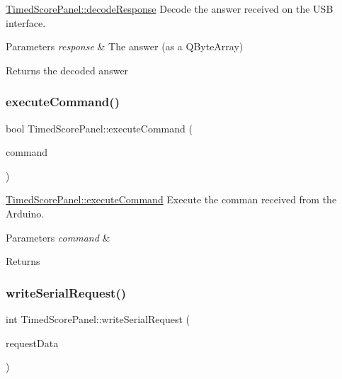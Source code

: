 \mbox{\hyperlink{classTimedScorePanel_aa4af54da0ec58b24e4e36812c90de9b8}{Timed\+Score\+Panel\+::decode\+Response}} Decode the answer received on the U\+SB interface. 


\begin{DoxyParams}{Parameters}
{\em response} & The answer (as a Q\+Byte\+Array) \\
\hline
\end{DoxyParams}
\begin{DoxyReturn}{Returns}
the decoded answer 
\end{DoxyReturn}
\mbox{\label{classTimedScorePanel_a0b1e7a7596b1e059571c65ce6046c343}} 
\subsubsection{\texorpdfstring{execute\+Command()}{executeCommand()}}
{\footnotesize\ttfamily bool Timed\+Score\+Panel\+::execute\+Command (\begin{DoxyParamCaption}\item[{Q\+Byte\+Array}]{command }\end{DoxyParamCaption})\hspace{0.3cm}{\ttfamily [protected]}}



\mbox{\hyperlink{classTimedScorePanel_a0b1e7a7596b1e059571c65ce6046c343}{Timed\+Score\+Panel\+::execute\+Command}} Execute the comman received from the Arduino. 


\begin{DoxyParams}{Parameters}
{\em command} & \\
\hline
\end{DoxyParams}
\begin{DoxyReturn}{Returns}

\end{DoxyReturn}
\mbox{\label{classTimedScorePanel_a4e817b212121e6970b2af49c8e7c47ca}} 
\subsubsection{\texorpdfstring{write\+Serial\+Request()}{writeSerialRequest()}}
{\footnotesize\ttfamily int Timed\+Score\+Panel\+::write\+Serial\+Request (\begin{DoxyParamCaption}\item[{Q\+Byte\+Array}]{request\+Data }\end{DoxyParamCaption})\hspace{0.3cm}{\ttfamily [protected]}}



